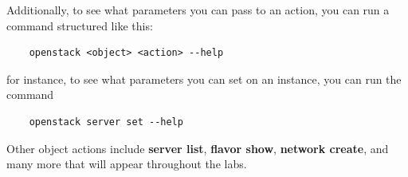 \documentclass[letterpaper, 12pt]{article}
\begin{document}
Additionally, to see what parameters you can pass to an action, you can run a command structured like this:
\begin{lstlisting}
    openstack <object> <action> --help
\end{lstlisting}
\noindent
for instance, to see what parameters you can set on an instance, you can run the command
\begin{lstlisting}
    openstack server set --help
\end{lstlisting}
\noindent
Other object actions include \textbf{server list}, \textbf{flavor show}, \textbf{network create}, and many more that will appear throughout the labs.
\end{document}
